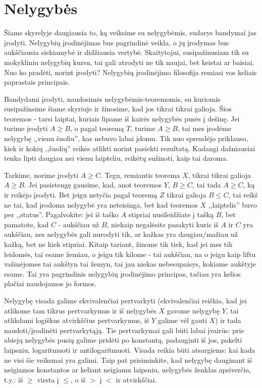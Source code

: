 
\section{Nelygybės}

Šiame skyrelyje daugiausia to, ką veiksime su nelygybėmis, sudarys bandymai
jas įrodyti. Nelygybių įrodinėjimas bus pagrindinė veikla, o jų įrodymas
bus aukščiausia siekiamybė ir didžiausia vertybė. Skaitytojui,
susipažinusiam tik su mokykliniu nelygybių kursu, tai gali atrodyti ne tik
naujai, bet keistai ar baisiai. Nuo ko pradėti, norint įrodyti? Nelygybių
įrodinėjimo filosofija remiasi vos keliais paprastais principais.

Bandydami įrodyti, naudosimės nelygybėmis-teoremomis, su kuriomis
susipažinsime šiame skyriuje ir žinosime, kad jos tikrai tikrai galioja.
Šios teoremos - tarsi laiptai, kuriais lipame iš kairės nelygybės pusės į
dešinę. Jei turime įrodyti $A\geq B$, o pagal teoremą $T$, turime
$A\geq B$, tai mes įrodėme nelygybę ,,vienu šuoliu'', kas nebuvo labai
įdomu. Tik nuo sprendėjo priklauso, kiek ir kokių ,,šuolių'' reikės atlikti
norint pasiekti rezultatą. Kadangi dažniausiai tenka lipti daugiau nei
vienu laipteliu, reikėtų sužinoti, kaip tai daroma.

Tarkime, norime įrodyti $A\geq C$. Tegu, remiantis teorema $X$,
tikrai tikrai galioja $A\geq B$. Jei pasistengę gausime, kad, anot
teoremos $Y$, $B\geq C$, tai tada $A\geq C$, ką ir reikėjo įrodyti. Bet
jeigu netyčia pagal teoremą $Z$ tikrai galioja $B\leq C$, tai reikš
ne tai, kad įrodoma nelygybė yra neteisinga, bet kad teoremos $X$
,,laiptelis'' buvo per ,,status''. Pagalvokite: jei iš taško $A$ stipriai
nusileidžiate į tašką $B$, bet pamatote, kad $C$ - aukščiau už $B$,
niekaip negalėsite pasakyti kuris iš $A$ ir $C$ yra aukščiau, nes nelygybės
gali nurodyti tik, ar kažkas yra daugiau/mažiau už kažką, bet ne kiek
stipriai. Kitaip tariant, žinome tik tiek, kad jei mes tik leidomės, tai
esame žemiau, o jeigu tik kilome - tai aukščiau, na o jeigu kaip liftu
važinėjomes tai aukštyn tai žemyn, tai jau niekas nebesupaisys, kokiame
aukštyje esame. Tai yra pagrindinis nelygybių įrodinėjimo principas, tačiau
yra kelios plačiai naudojamos jo formos.

Nelygybę visada galime ekvivalenčiai pertvarkyti (ekvivalenčiai reiškia,
kad jei atlikome tam tikrus pertvarkymus ir iš nelygybės $X$ gavome
nelygybę $Y$, tai atlikdami logiškus atvirkščius pertvarkymus, iš $Y$
galime vėl gauti $X$) ir tada naudoti/įrodinėti pertvarkytąją. Tie
pertvarkymai gali būti labai įvairūs: prie abiejų nelygybės pusių galime
pridėti po konstantą, padauginti iš jos, pakelti laipsniu, logaritmuoti ir
antilogaritmuoti. Visada reikia būti atsargiems: kai kada ne visi šie
veiksmai yra galimi. Taip pat prisiminkite, kad nelygybę dauginant iš
neigiamos konstantos ar keliant neigiamu laipsniu, nelygybės ženklas
apsiverčia, t.y.: iš $\geq$ virsta į $\leq$, o iš $>$ į $<$ ir atvirkščiai.

